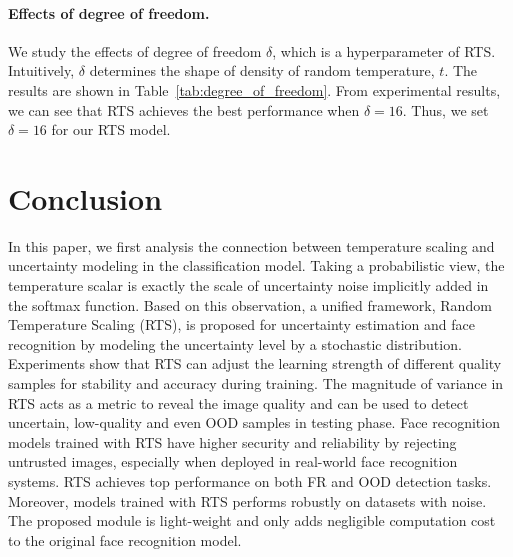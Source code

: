 \documentclass[letterpaper]{article} %
\begin{document}
\paragraph{Effects of degree of freedom.} We study the effects of degree of freedom $\delta$, which is a hyperparameter of RTS. Intuitively, $\delta$ determines the shape of density of random temperature, $t$. The results are shown in Table~\ref{tab:degree_of_freedom}. From experimental results, we can see that RTS achieves the best performance when $\delta = 16$. Thus, we set $\delta = 16$ for our RTS model.



\vspace{-0.79mm}
\section{Conclusion}
\label{sec:conclusion}

In this paper, we first analysis the connection between temperature scaling and uncertainty modeling in the classification model. Taking a probabilistic view, the temperature scalar is exactly the scale of uncertainty noise implicitly added in the softmax function. Based on this observation, a unified framework, Random Temperature Scaling (RTS), is proposed for uncertainty estimation and face recognition by modeling the uncertainty level by a stochastic distribution.  Experiments show that RTS can adjust the learning strength of different quality samples for stability and accuracy during training. The magnitude of variance in RTS acts as a metric to reveal the image quality and can be used to detect uncertain, low-quality and even OOD samples in testing phase.
Face recognition models trained with RTS have higher security and reliability by rejecting untrusted images, especially when deployed in real-world face recognition systems. RTS achieves top performance on both FR and OOD detection tasks. Moreover, models trained with RTS performs robustly on datasets with noise. The proposed module is light-weight and only adds negligible computation cost to the original face recognition model.


\vspace{-0.81mm}
\end{document}
